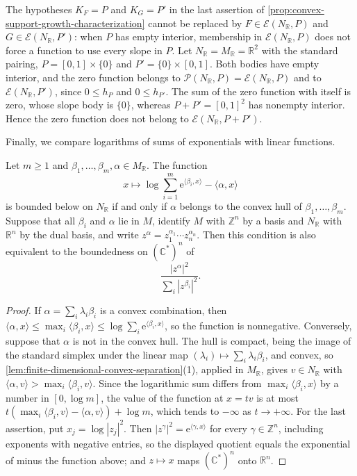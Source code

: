 \begin{example}\label{ex:convex-degenerate-full-mass-sum}
The hypotheses $K_F=P$ and $K_G=P'$ in the last assertion of \cref{prop:convex-support-growth-characterization} cannot be replaced by $F\in\mathcal E(N_{\mathbb R},P)$ and $G\in\mathcal E(N_{\mathbb R},P')$: when $P$ has empty interior, membership in $\mathcal E(N_{\mathbb R},P)$ does not force a function to use every slope in $P$. Let $N_{\mathbb R}=M_{\mathbb R}=\mathbb R^2$ with the standard pairing, $P=[0,1]\times\{0\}$ and $P'=\{0\}\times[0,1]$. Both bodies have empty interior, and the zero function belongs to $\mathcal P(N_{\mathbb R},P)=\mathcal E(N_{\mathbb R},P)$ and to $\mathcal E(N_{\mathbb R},P')$, since $0\leq h_P$ and $0\leq h_{P'}$. The sum of the zero function with itself is zero, whose slope body is $\{0\}$, whereas $P+P'=[0,1]^2$ has nonempty interior. Hence the zero function does not belong to $\mathcal E(N_{\mathbb R},P+P')$.
\end{example}

Finally, we compare logarithms of sums of exponentials with linear functions.

\begin{lemma}\label{lem:monomial-growth-convex-hull}
Let $m\geq1$ and $\beta_1,\ldots,\beta_m,\alpha\in M_{\mathbb R}$. The function
\[
 x\longmapsto\log\sum_{i=1}^m\mathrm e^{\langle\beta_i,x\rangle}
                         -\langle\alpha,x\rangle
\]
is bounded below on $N_{\mathbb R}$ if and only if $\alpha$ belongs to the convex hull of $\beta_1,\ldots,\beta_m$. Suppose that all $\beta_i$ and $\alpha$ lie in $M$, identify $M$ with $\mathbb Z^n$ by a basis and $N_{\mathbb R}$ with $\mathbb R^n$ by the dual basis, and write $z^\alpha=z_1^{\alpha_1}\cdots z_n^{\alpha_n}$. Then this condition is also equivalent to the boundedness on $(\mathbb C^*)^n$ of
\[
 \frac{|z^\alpha|^2}{\sum_i|z^{\beta_i}|^2}.
\]
\end{lemma}
\begin{proof}
If $\alpha=\sum_i\lambda_i\beta_i$ is a convex combination, then $\langle\alpha,x\rangle\leq\max_i\langle\beta_i,x\rangle\leq\log\sum_i\mathrm e^{\langle\beta_i,x\rangle}$, so the function is nonnegative. Conversely, suppose that $\alpha$ is not in the convex hull. The hull is compact, being the image of the standard simplex under the linear map $(\lambda_i)\mapsto\sum_i\lambda_i\beta_i$, and convex, so \cref{lem:finite-dimensional-convex-separation}(1), applied in $M_{\mathbb R}$, gives $v\in N_{\mathbb R}$ with $\langle\alpha,v\rangle>\max_i\langle\beta_i,v\rangle$. Since the logarithmic sum differs from $\max_i\langle\beta_i,x\rangle$ by a number in $[0,\log m]$, the value of the function at $x=tv$ is at most $t(\max_i\langle\beta_i,v\rangle-\langle\alpha,v\rangle)+\log m$, which tends to $-\infty$ as $t\to+\infty$. For the last assertion, put $x_j=\log|z_j|^2$. Then $|z^\gamma|^2=\mathrm e^{\langle\gamma,x\rangle}$ for every $\gamma\in\mathbb Z^n$, including exponents with negative entries, so the displayed quotient equals the exponential of minus the function above; and $z\mapsto x$ maps $(\mathbb C^*)^n$ onto $\mathbb R^n$.
\end{proof}

